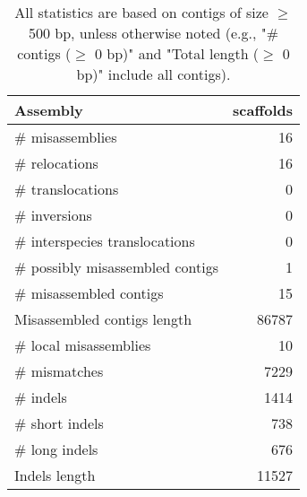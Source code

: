 \documentclass[12pt,a4paper]{article}
\begin{document}
\begin{table}[ht]
\begin{center}
\caption{All statistics are based on contigs of size $\geq$ 500 bp, unless otherwise noted (e.g., "\# contigs ($\geq$ 0 bp)" and "Total length ($\geq$ 0 bp)" include all contigs).}
\begin{tabular}{|l*{1}{|r}|}
\hline
Assembly & scaffolds \\ \hline
\# misassemblies & 16 \\ \hline
\hspace{5mm}\# relocations & 16 \\ \hline
\hspace{5mm}\# translocations & 0 \\ \hline
\hspace{5mm}\# inversions & 0 \\ \hline
\hspace{5mm}\# interspecies translocations & 0 \\ \hline
\# possibly misassembled contigs & 1 \\ \hline
\# misassembled contigs & 15 \\ \hline
Misassembled contigs length & 86787 \\ \hline
\# local misassemblies & 10 \\ \hline
\# mismatches & 7229 \\ \hline
\# indels & 1414 \\ \hline
\hspace{5mm}\# short indels & 738 \\ \hline
\hspace{5mm}\# long indels & 676 \\ \hline
Indels length & 11527 \\ \hline
\end{tabular}
\end{center}
\end{table}
\end{document}
